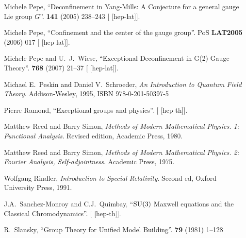 \begin{thebibliography}{99}
Michele Pepe,
``Deconfinement in Yang-Mills: A Conjecture for a general gauge Lie group $G$''.
 \textbf{141} (2005) 238--243
{\tt{}}
[ [hep-lat]].

Michele Pepe,
``Confinement and the center of the gauge group''.
PoS \textbf{LAT2005} (2006) 017
{\tt{}}
[ [hep-lat]].

Michele Pepe and U.~J.~Wiese,
``Exceptional Deconfinement in G(2) Gauge Theory''.
 \textbf{768} (2007) 21--37
{\tt{}}
[ [hep-lat]].

Michael E.~Peskin and Daniel V.~Schroeder,
\textit{An Introduction to Quantum Field Theory}.
Addison-Wesley, 1995,
ISBN 978-0-201-50397-5

Pierre Ramond,
``Exceptional groups and physics''.
[ [hep-th]].

Matthew Reed and Barry Simon,
\textit{Methods of Modern Mathematical Physics. 1: Functional Analysis}.
Revised edition, Academic Press, 1980.

Matthew Reed and Barry Simon,
\textit{Methods of Modern Mathematical Physics. 2: Fourier Analysis, Self-adjointness}.
Academic Press, 1975.

Wolfgang Rindler,
\textit{Introduction to Special Relativity}.
Second ed, Oxford University Press, 1991.

  
J.A.~Sanchez-Monroy and C.J.~Quimbay,
``$\operatorname{SU}(3)$ Maxwell equations and the Classical Chromodynamics''.
[ [hep-th]].

R.~Slansky,
``Group Theory for Unified Model Building''.
 \textbf{79} (1981) 1--128
{\tt{}}


\end{thebibliography}
